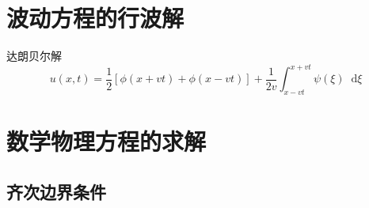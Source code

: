 \documentclass{article}
\newcommand*{\md}{\mathop{}\!\mathrm{d}}
\begin{document}
\section{波动方程的行波解}

达朗贝尔解
\begin{equation*}
  u(x,t) = \dfrac{1}{2} \left[ \phi (x + vt) + \phi (x - vt) \right] + \dfrac{1}{2v} \int_{x-vt}^{x+vt} \psi(\xi) \md \xi
\end{equation*}

\section{数学物理方程的求解}

\subsection{齐次边界条件}
\end{document}
